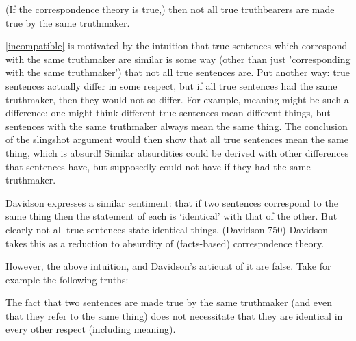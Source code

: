 

	\begin{thesis} \label{incompatible}
	(If the correspondence theory is true,) then not all true truthbearers are made true by the same truthmaker.
	\end{thesis}

\ref{incompatible} is motivated by the intuition that true sentences which correspond with the same truthmaker are similar is some way (other than just 'corresponding with the same truthmaker') that not all true sentences are.
Put another way: true sentences actually differ in some respect, but if all true sentences had the same truthmaker, then they would not so differ.
For example, meaning might be such a difference: one might think different true sentences mean different things, but sentences with the same truthmaker always mean the same thing.
The conclusion of the slingshot argument would then show that all true sentences mean the same thing, which is absurd!
Similar absurdities could be derived with other differences that sentences have, but supposedly could not have if they had the same truthmaker.

Davidson expresses a similar sentiment: that if two sentences correspond to the same thing then the statement of each is `identical' with that of the other.
But clearly not all true sentences state identical things.
(Davidson 750)
Davidson takes this as a reduction to absurdity of (facts-based) correspndence theory.  %


However, the above intuition, and Davidson's articuat of it are false.
Take for example the following truths:


The fact that two sentences are made true by the same truthmaker (and even that they refer to the same thing) does not necessitate that they are identical in every other respect (including meaning).

